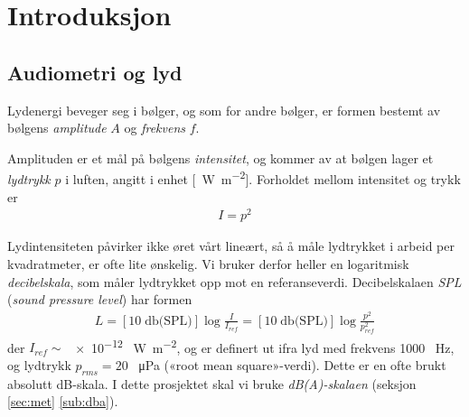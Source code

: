 \documentclass[norsk, twocolumn,letterpaper,11pt,fleqn]{extarticle}
\title{}
\newcommand{\equ}[1]{{\small\begin{align}#1\end{align}}}
\begin{document}

\section{Introduksjon}
\label{sec:intro}
\subsection{Audiometri og lyd}
\label{sub:audio}
Lydenergi beveger seg i bølger, 
og som for andre bølger, er formen bestemt av bølgens \textit{amplitude} $A$ 
og \textit{frekvens} $f$.

Amplituden er et mål på bølgens \textit{intensitet}, og kommer av at bølgen lager et 
\textit{lydtrykk} $p$ i luften, angitt i enhet [\SI{}{\W\per\meter\squared}]. 
Forholdet mellom intensitet og trykk er
\equ{
	I = p^2
}

Lydintensiteten påvirker ikke øret vårt lineært, 
så å måle lydtrykket i arbeid per kvadratmeter, er ofte lite ønskelig.
Vi bruker derfor heller en logaritmisk \textit{decibelskala}, 
som måler lydtrykket opp mot en referanseverdi. Decibelskalaen \textit{SPL} 
(\textit{sound pressure level}) har formen
\equ{
	L = [10\;\text{db(SPL)}]\log \frac{I}{I_{ref}}
	= [10\;\text{db(SPL)}]\log \frac{p^2}{p^2_{ref}}
\label{eq:Iref}}
der $I_{ref} \sim$ \num{e-12} \SI{}{\W\per\meter\squared}, og er definert ut ifra lyd med
frekvens \num{1000} \SI{}{\Hz}, 
og lydtrykk $p_{rms} = 20$ \SI{}{\micro\Pa} («root mean square»-verdi). 
Dette er en ofte brukt absolutt dB-skala. I dette prosjektet  
skal vi bruke \textit{dB(A)-skalaen} (seksjon \ref{sec:met} \ref{sub:dba}).
\end{document}
